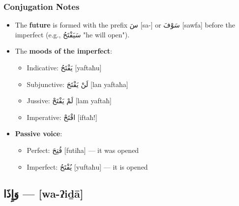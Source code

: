 \documentclass[letter,12pt]{article}
\begin{document}
\subsubsection*{Conjugation Notes}
\begin{itemize}
  \item The \textbf{future} is formed with the prefix \textarabic{سَ} [sa-] or \textarabic{سَوْفَ} [sawfa] before the imperfect (e.g., \textarabic{سَيَفْتَحُ} "he will open").
  \item The \textbf{moods of the imperfect}: 
    \begin{itemize}
      \item Indicative: \textarabic{يَفْتَحُ} [yaftaħu] 
      \item Subjunctive: \textarabic{لَنْ يَفْتَحَ} [lan yaftaħa]
      \item Jussive: \textarabic{لَمْ يَفْتَحْ} [lam yaftaħ]
      \item Imperative: \textarabic{افْتَحْ} [iftaħ!]
    \end{itemize}
  \item \textbf{Passive voice}: 
    \begin{itemize}
      \item Perfect: \textarabic{فُتِحَ} [futiħa] — it was opened
      \item Imperfect: \textarabic{يُفْتَحُ} [yuftaħu] — it is opened
    \end{itemize}
\end{itemize}

\subsection{\textarabic{وَإِذَا} — [wa-ʔiḏā]}
\end{document}
